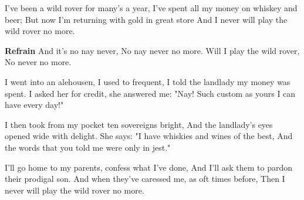 \footnotemark [
ititle={Wild rover (The)}]

\beginverse
I've been a wild rover for many's a year,
I've spent all my money on whiskey and beer;
But now I'm returning with gold in great store
And I never will play the wild rover no more.
\endverse

\beginchorus
\textbf{Refrain}
And it's no nay never,
No nay never no more.
Will I play the wild rover,
No never no more.
\endchorus

\beginverse
I went into an alehousen, I used to frequent,
I told the landlady my money was spent.
I asked her for credit, she answered me: "Nay!
Such custom as yours I can have every day!"
\endverse

\beginverse
I then took from my pocket ten sovereigns bright,
And the landlady's eyes opened wide with delight.
She says: "I have whiskies and wines of the best,
And the words that you told me were only in jest."
\endverse

\beginverse
I'll go home to my parents, confess what I've done,
And I'll ask them to pardon their prodigal son.
And when they've caressed me, as oft times before,
Then I never will play the wild rover no more.
\endverse
\endsong